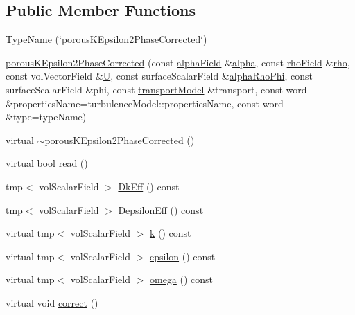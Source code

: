 \subsection*{Public Member Functions}
\begin{DoxyCompactItemize}
\item 
\hyperlink{classFoam_1_1RASModels_1_1porousKEpsilon2PhaseCorrected_a5433d355e33b34de63785cf7416283e3}{Type\+Name} (\char`\"{}porous\+K\+Epsilon2\+Phase\+Corrected\char`\"{})
\item 
\hyperlink{classFoam_1_1RASModels_1_1porousKEpsilon2PhaseCorrected_aab092b1f42136e6dd8f4c513c6d708c1}{porous\+K\+Epsilon2\+Phase\+Corrected} (const \hyperlink{classFoam_1_1RASModels_1_1porousKEpsilon2PhaseCorrected_a06a66094f33d6817d19225445c5ea874}{alpha\+Field} \&\hyperlink{UEqn__1pl_8H_a7fe02434a19f3e00e927f32adcbb193b}{alpha}, const \hyperlink{classFoam_1_1RASModels_1_1porousKEpsilon2PhaseCorrected_a1dda906cfc9022335f0782a632302cd8}{rho\+Field} \&\hyperlink{EEqn__1pl_8H_ac955f87ac2b79f02f420cae087fc52b1}{rho}, const vol\+Vector\+Field \&\hyperlink{UEqn__1pl_8H_abe23fa3afe09cc511569a7dca4160561}{U}, const surface\+Scalar\+Field \&\hyperlink{updateAlphaPhiAndInitControls__1p_8H_adb16eab5a684ddb62e40a6ffdc2d646c}{alpha\+Rho\+Phi}, const surface\+Scalar\+Field \&phi, const \hyperlink{classFoam_1_1RASModels_1_1porousKEpsilon2PhaseCorrected_ac0a5dc3c45a2d1c61a649bc435a1a48a}{transport\+Model} \&transport, const word \&properties\+Name=turbulence\+Model\+::properties\+Name, const word \&type=type\+Name)
\item 
virtual \hyperlink{classFoam_1_1RASModels_1_1porousKEpsilon2PhaseCorrected_ac192074878c4da0937d72597af9d1b8b}{$\sim$porous\+K\+Epsilon2\+Phase\+Corrected} ()
\item 
virtual bool \hyperlink{classFoam_1_1RASModels_1_1porousKEpsilon2PhaseCorrected_af816873151ddb0126e98bb2f914d8ed5}{read} ()
\item 
tmp$<$ vol\+Scalar\+Field $>$ \hyperlink{classFoam_1_1RASModels_1_1porousKEpsilon2PhaseCorrected_a1faa4b448524c4de622637dc51aa4a30}{Dk\+Eff} () const
\item 
tmp$<$ vol\+Scalar\+Field $>$ \hyperlink{classFoam_1_1RASModels_1_1porousKEpsilon2PhaseCorrected_aaeb98c07acb7524ea98bf458352bc85a}{Depsilon\+Eff} () const
\item 
virtual tmp$<$ vol\+Scalar\+Field $>$ \hyperlink{classFoam_1_1RASModels_1_1porousKEpsilon2PhaseCorrected_a2cc3daa68147a9052c2b37e9ac37eca4}{k} () const
\item 
virtual tmp$<$ vol\+Scalar\+Field $>$ \hyperlink{classFoam_1_1RASModels_1_1porousKEpsilon2PhaseCorrected_ad79e047917669fbb490d351478651e20}{epsilon} () const
\item 
virtual tmp$<$ vol\+Scalar\+Field $>$ \hyperlink{classFoam_1_1RASModels_1_1porousKEpsilon2PhaseCorrected_a384ad699f7960a8b9686b4a5fe7f3e1a}{omega} () const
\item 
virtual void \hyperlink{classFoam_1_1RASModels_1_1porousKEpsilon2PhaseCorrected_a3ae44b28050c3aa494c1d8e18cf618c1}{correct} ()
\end{DoxyCompactItemize}
